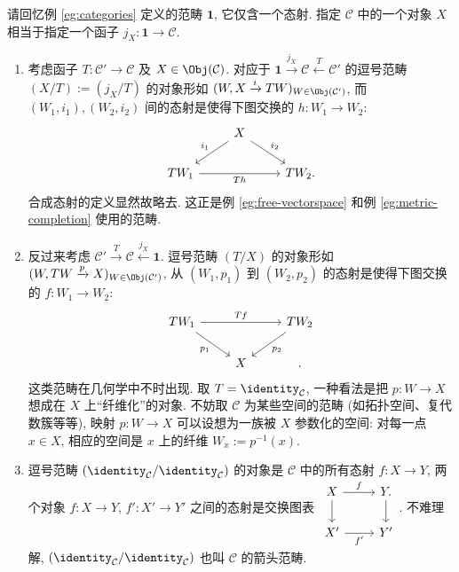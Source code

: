 请回忆例 \ref{eg:categories} 定义的范畴 $\mathbf{1}$, 它仅含一个态射. 指定 $\mathcal{C}$ 中的一个对象 $X$ 相当于指定一个函子 $j_X: \mathbf{1} \to \mathcal{C}$. 
\begin{enumerate}
	\item 考虑函子 $T: \mathcal{C}' \to \mathcal{C}$ 及 $X \in \Obj(\mathcal{C})$. 对应于 $\mathbf{1} \xrightarrow{j_X} \mathcal{C} \xleftarrow{T} \mathcal{C}'$ 的逗号范畴 $(X / T) := (j_X / T)$ 的对象形如 $(W, X \xrightarrow{i} TW)_{W \in \Obj(\mathcal{C}')}$, 而 $(W_1, i_1), (W_2, i_2)$ 间的态射是使得下图交换的 $h: W_1 \to W_2$:
		\[ \begin{tikzcd}
			{} & X \arrow[ld, "i_1"'] \arrow[rd, "i_2"] & \\
			TW_1 \arrow[rr, "Th"'] & & TW_2 .
		\end{tikzcd} \]
		合成态射的定义显然故略去. 这正是例 \ref{eg:free-vectorspace} 和例 \ref{eg:metric-completion} 使用的范畴.
  \item 反过来考虑 $\mathcal{C}' \xrightarrow{T} \mathcal{C} \xleftarrow{j_X} \mathbf{1}$. 逗号范畴 $(T / X)$ 的对象形如 $(W, TW \xrightarrow{p} X)_{W \in \Obj(\mathcal{C}')}$, 从 $(W_1, p_1)$ 到 $(W_2, p_2)$ 的态射是使得下图交换的 $f: W_1 \to W_2$:
		\[ \begin{tikzcd}
			TW_1 \arrow[rd, "p_1"'] \arrow[rr, "Tf"] & & TW_2 \arrow[ld, "p_2"] \\
			& X & .
		\end{tikzcd} \]
		这类范畴在几何学中不时出现. 取 $T = \identity_{\mathcal{C}}$, 一种看法是把 $p: W \to X$ 想成在 $X$ 上``纤维化''的对象. 不妨取 $\mathcal{C}$ 为某些空间的范畴 (如拓扑空间、复代数簇等等), 映射 $p: W \to X$ 可以设想为一族被 $X$ 参数化的空间: 对每一点 $x \in X$, 相应的空间是 $x$ 上的纤维 $W_x := p^{-1}(x)$. 

	\item 逗号范畴 $(\identity_{\mathcal{C}} / \identity_{\mathcal{C}})$ 的对象是 $\mathcal{C}$ 中的所有态射 $f: X \to Y$, 两个对象 $f: X \to Y$, $f': X' \to Y'$ 之间的态射是交换图表
	$\begin{tikzcd}
		X \arrow[r, "f"] \arrow[d] & Y \arrow[d] . \\
		X' \arrow[r, "f'"'] & Y'
	\end{tikzcd}$.
	不难理解, $(\identity_{\mathcal{C}} / \identity_{\mathcal{C}})$ 也叫 $\mathcal{C}$ 的箭头范畴.
\end{enumerate}

